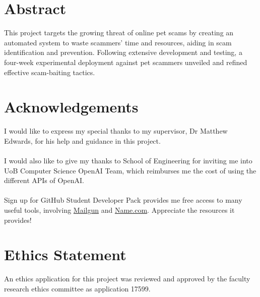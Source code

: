 \documentclass[ oneside,%
                    author={Cassie Qing Tang},
                    degree={BSc},
                     title={An Automated Response System for Disrupting Online Pet Scamming \\ },
                    subtitle={ }]{dissertation}
\begin{document}
\maketitle

\chapter*{Abstract}
This project targets the growing threat of online pet scams by creating an automated system to waste scammers' time and resources, aiding in scam identification and prevention. Following extensive development and testing, a four-week experimental deployment against pet scammers unveiled and refined effective scam-baiting tactics.

\chapter*{Acknowledgements}
I would like to express my special thanks to my supervisor, Dr Matthew Edwards, for his help and guidance in this project.
\\
\\
I would also like to give my thanks to School of Engineering for inviting me into UoB Computer Science OpenAI Team, which reimburses me the cost of using the different APIs of OpenAI.
\\
\\
Sign up for GitHub Student Developer Pack provides me free access to many useful tools, involving \href{https://www.mailgun.com}{Mailgun} and \href{https://www.name.com}{Name.com}. Appreciate the resources it provides!

\makedecl


\tableofcontents
\listoffigures
\listoftables

\chapter*{Ethics Statement}
An ethics application for this project was reviewed and approved by the faculty research ethics committee as application 17599.
\end{document}
